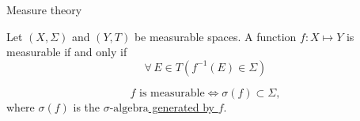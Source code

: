 \documentclass[utf-8, 10pt, aspectratio=1610]{beamer}
\begin{document}
\begin{frame}[allowframebreaks]{Measure theory}
\begin{definition}
\begin{minipage}[t]{0.4\linewidth}
\begin{figure}[htbp]
			\end{figure}
		\end{minipage}
		\vspace*{2em}
	\end{definition}

	\vspace*{\fill}
	\framebreak
	\vspace*{\fill}

	\begin{definition}
		Let \(\left(X,\Sigma\right)\) and \(\left(Y,T\right)\) be measurable spaces. A function \(f:X\mapsto Y\) is measurable if and only if
		\begin{equation}
			\forall\, E \in T \left( f^{-1}(E) \in \Sigma\right)
		\end{equation}
	\end{definition}

	\vspace*{\fill}

	\begin{corollary}[]
		\begin{equation}
			f \text{ is measurable}  \Leftrightarrow\sigma\left(f\right) \subset \Sigma,
		\end{equation}
		where \(\sigma\left(f\right)\) is the \href{https://en.wikipedia.org/wiki/\%CE\%A3-algebra\#\%CF\%83-algebra\_generated\_by\_a\_function}{\(\sigma \text{-algebra} \) generated by \(f\)}.
	\end{corollary}

	\vspace*{\fill}
\end{frame}
\end{document}
